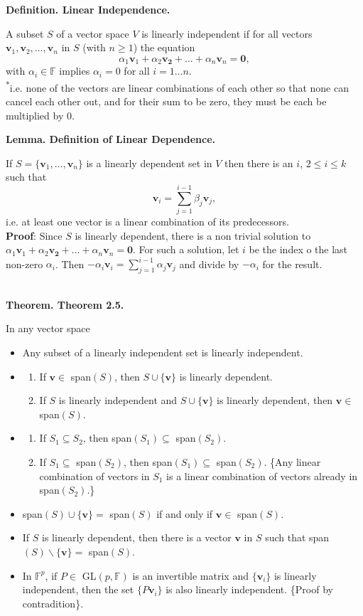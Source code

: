 \documentclass{article}
\newcommand{\vect}[1]{\mathbf{#1}}
\newcommand{\definition}[2]{\textbf{Definition. #1.}\begin{adjustwidth}{1cm}{1cm}#2\end{adjustwidth}}
\newcommand{\theorem}[2]{\textbf{Theorem. #1.}\begin{adjustwidth}{1cm}{1cm}#2\end{adjustwidth}}
\newcommand{\lemma}[2]{\textbf{Lemma. #1.}\begin{adjustwidth}{1cm}{1cm}#2\end{adjustwidth}}
\begin{document}
\definition{Linear Independence}{A subset $S$ of a vector space $V$ is linearly independent if for all vectors $\vect{v}_1, \vect{v}_2, \ldots, \vect{v}_n$ in $S$ (with $n \geq 1$) the equation \[\alpha_1 \vect{v}_1 + \alpha_2 \vect{v_2} + \ldots + \alpha _n \vect{v}_n = \vect{0},\]with $\alpha _i \in \mathbb{F}$ implies $\alpha_i = 0$ for all $i = 1\ldots n$.\\[1\baselineskip]\textsuperscript{*}i.e. none of the vectors are linear combinations of each other so that none can cancel each other out, and for their sum to be zero, they must be each be multiplied by 0.}
\lemma{Definition of Linear Dependence}{If $S = \{ \vect{v}_1, \ldots , \vect{v}_n \}$ is a linearly dependent set in $V$ then there is an $i$, $2 \leq i \leq k$ such that \[ \vect{v}_i = \sum_{j=1}^{i-1} \beta _j \vect{v}_j,\]i.e. at least one vector is a linear combination of its predecessors.\\\textbf{Proof}: Since $S$ is linearly dependent, there is a non trivial solution to $\alpha_1 \vect{v}_1 + \alpha_2 \vect{v_2} + \ldots + \alpha _n \vect{v}_n = \vect{0}$. For such a solution, let $i$ be the index o the last non-zero $\alpha_i$. Then $-\alpha_i \vect{v}_i = \sum_{j=1}^{i-1} \alpha_j \vect{v}_j$ and divide by $- \alpha_i$ for the result.}~\\
\theorem{Theorem 2.5}{In any vector space
\begin{itemize}
  \item Any subset of a linearly independent set is linearly independent.
  \item \begin{enumerate}
    \item If $\vect{v} \in$ span$(S)$, then $S \cup \{ \vect{v} \}$ is linearly dependent.
    \item If $S$ is linearly independent and $S \cup \{ \vect{v} \}$ is linearly dependent, then $\vect{v} \in $ span$(S)$.
  \end{enumerate}
  \item \begin{enumerate}
    \item If $S_1 \subseteq S_2$, then span$(S_1) \subseteq$ span$(S_2)$.
    \item If $S_1 \subseteq$ span$(S_2)$, then span$(S_1) \subseteq$ span$(S_2)$. \{Any linear combination of vectors in $S_1$ is a linear combination of vectors already in span$(S_2)$.\}
  \end{enumerate}
  \item span$(S) \cup \{ \vect{v} \} = $ span$(S)$ if and only if $\vect{v} \in $ span$(S)$.
  \item If $S$ is linearly dependent, then there is a vector $\vect{v}$ in $S$ such that span$(S) \backslash \{ \vect{v} \} = $ span$(S)$.
  \item In $\mathbb{F}^p$, if $P \in$ GL$(p, \mathbb{F})$ is an invertible matrix and $\{ \vect{v}_i \}$ is linearly independent, then the set $\{ P \vect{v}_i \}$ is also linearly independent. \{Proof by contradition\}.
\end{itemize}}~\\
\end{document}
